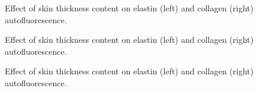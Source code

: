 \begin{appendices}
\begin{figure}[!htbp]
    \centering
    \caption{Effect of skin thickness content on elastin (left) and collagen (right) autofluorescence.}%
    \label{fig:320elastincollagen-thickness}%
\end{figure}

\begin{figure}[!htbp]
    \centering
    \caption{Effect of skin thickness content on elastin (left) and collagen (right) autofluorescence.}%
    \label{fig:365elastincollagen-thickness}%
\end{figure}

\begin{figure}[!htbp]
    \centering
    \caption{Effect of skin thickness content on elastin (left) and collagen (right) autofluorescence.}%
    \label{fig:450nadhcollagen-thickness}%
\end{figure}

\end{appendices}
